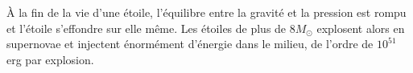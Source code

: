 







À la fin de la vie d'une étoile, l'équilibre entre la gravité et la pression est rompu et l'étoile s'effondre sur elle même.
Les étoiles de plus de $8 M_\odot$ explosent alors en supernovae et injectent énormément d'énergie dans le milieu, de l'ordre de $10^{51}$ erg par explosion. 


